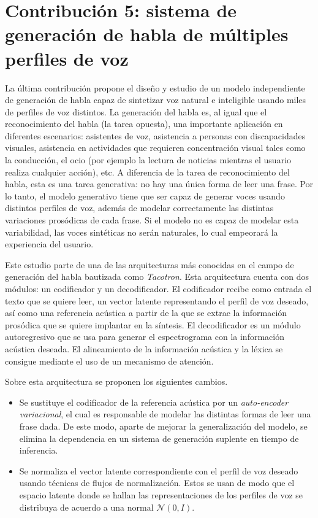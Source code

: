 \section*{Contribución 5: sistema de generación de habla de múltiples perfiles de voz}
La última contribución propone el diseño y estudio de un modelo independiente de generación de habla capaz de sintetizar voz natural e inteligible usando miles de perfiles de voz distintos. La generación del habla es, al igual que el reconocimiento del habla (la tarea opuesta), una importante aplicación en diferentes escenarios: asistentes de voz, asistencia a personas con discapacidades visuales, asistencia en actividades que requieren concentración visual tales como la conducción, el ocio (por ejemplo la lectura de noticias mientras el usuario realiza cualquier acción), etc. A diferencia de la tarea de reconocimiento del habla, esta es una tarea generativa: no hay una única forma de leer una frase. Por lo tanto, el modelo generativo tiene que ser capaz de generar voces usando distintos perfiles de voz, además de modelar correctamente las distintas variaciones prosódicas de cada frase. Si el modelo no es capaz de modelar esta variabilidad, las voces sintéticas no serán naturales, lo cual empeorará la experiencia del usuario.

Este estudio parte de una de las arquitecturas más conocidas en el campo de generación del habla bautizada como \textit{Tacotron}. Esta arquitectura cuenta con dos módulos: un codificador y un decodificador. El codificador recibe como entrada el texto que se quiere leer, un vector latente representando el perfil de voz deseado, así como una referencia acústica a partir de la que se extrae la información prosódica que se quiere implantar en la síntesis. El decodificador es un módulo autoregresivo que se usa para generar el espectrograma con la información acústica deseada. El alineamiento de la información acústica y la léxica se consigue mediante el uso de un mecanismo de atención. 

Sobre esta arquitectura se proponen los siguientes cambios.

\begin{itemize}
	\item Se sustituye el codificador de la referencia acústica por un \textit{auto-encoder variacional}, el cual es responsable de modelar las distintas formas de leer una frase dada. De este modo, aparte de mejorar la generalización del modelo, se elimina la dependencia en un sistema de generación suplente en tiempo de inferencia. 
	\item Se normaliza el vector latente correspondiente con el perfil de voz deseado usando técnicas de flujos de normalización. Estos se usan de modo que el espacio latente donde se hallan las representaciones de los perfiles de voz se distribuya de acuerdo a una normal $\mathcal{N}(0, I)$.
\end{itemize}

